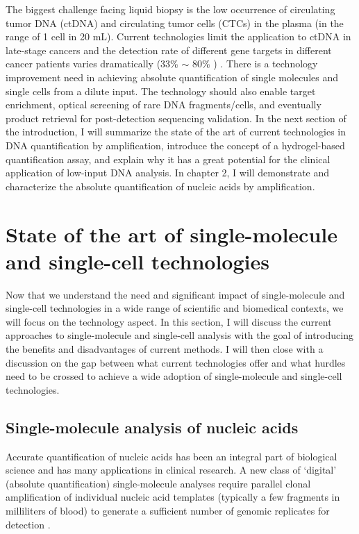 The biggest challenge facing liquid biopsy is the low occurrence of circulating tumor DNA (ctDNA) and circulating tumor cells (CTCs) in the plasma (in the range of 1 cell in 20 mL). 
Current technologies limit the application to ctDNA in late-stage cancers and the detection rate of different gene targets in different cancer patients varies dramatically (33\% $\sim$ 80\% ) \cite{Esteller:1999tq}. There is a technology improvement need in achieving absolute quantification of single molecules and single cells from a dilute input. The technology should also enable target enrichment, optical screening of rare DNA fragments/cells, and eventually product retrieval for post-detection sequencing validation. In the next section of the introduction, I will summarize the state of the art of current technologies in DNA quantification by amplification, introduce the concept of a hydrogel-based quantification assay, and explain why it has a great potential for the clinical application of low-input DNA analysis. In chapter 2, I will demonstrate and characterize the absolute quantification of nucleic acids by amplification. 
\section{State of the art of single-molecule and single-cell technologies}
Now that we understand the need and significant impact of single-molecule and single-cell technologies in a wide range of scientific and biomedical contexts, we will focus on the technology aspect. In this section, I will discuss the current approaches to single-molecule and single-cell analysis with the goal of introducing the benefits and disadvantages of current methods. I will then close with a discussion on the gap between what current technologies offer and what hurdles need to be crossed to achieve a wide adoption of single-molecule and single-cell technologies. 

\subsection{Single-molecule analysis of nucleic acids}
Accurate quantification of nucleic acids has been an integral part of biological science and has many applications in clinical research. A new class of `digital' (absolute quantification) single-molecule analyses require parallel clonal amplification of individual nucleic acid templates (typically a few fragments in milliliters of blood) to generate a sufficient number of genomic replicates for detection \cite{Zou:2017dq,Jennings:2014et,Lun:2008cp,Cochran:2014cn,Lo:2007hb,Vogelstain:1999ve,Sykes:1992tm}. 

